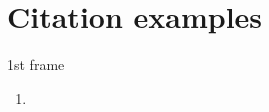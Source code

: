 
\section{Citation examples}
\begin{frame}{1st frame}
\begin{enumerate}
    \item \the\footskip \footnotemark{} \addfootspace{}\addfootspace{}
\end{enumerate}
\end{frame}